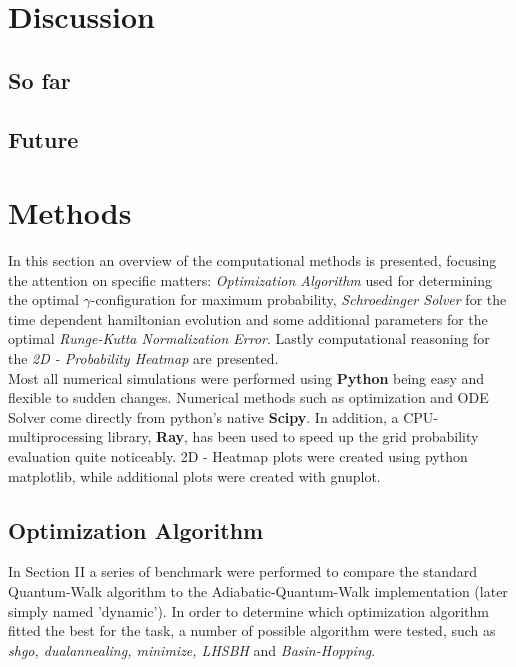 \documentclass[aps,pra,reprint]{revtex4-2}
\begin{document}
\section{Discussion}
\subsection{So far}
\subsection{Future}


\section{Methods}
In this section an overview of the computational methods is presented, focusing the attention on specific matters: \textit{Optimization Algorithm} used for determining the optimal $\gamma$-configuration for maximum probability, \textit{Schroedinger Solver} for the time dependent hamiltonian evolution and some additional parameters for the optimal \textit{Runge-Kutta Normalization Error}. Lastly computational reasoning for the \textit{2D - Probability Heatmap} are presented. \\

Most all numerical simulations were performed using \textbf{Python} being easy and flexible to sudden changes. Numerical methods such as optimization and ODE Solver come directly from python's native \textbf{Scipy}. In addition, a CPU-multiprocessing library, \textbf{Ray}, has been used to speed up the grid probability evaluation quite noticeably. 2D - Heatmap plots were created using python matplotlib, while additional plots were created with gnuplot. 

\subsection{Optimization Algorithm}
In Section II a series of benchmark were performed to compare the standard Quantum-Walk algorithm to the Adiabatic-Quantum-Walk implementation (later simply named 'dynamic'). In order to determine which optimization algorithm fitted the best for the task, a number of possible algorithm were tested, such as \textit{shgo, dualannealing, minimize, LHSBH} and \textit{Basin-Hopping}. \\
\end{document}
